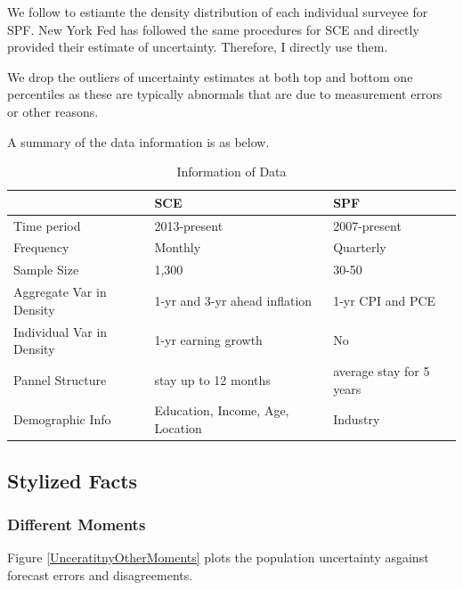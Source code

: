 \documentclass[]{article}
\begin{document}
We follow \cite{Manski} to estiamte the density distribution of each individual surveyee for SPF. New York Fed has followed the same procedures for SCE and directly provided their estimate of uncertainty. Therefore, I directly use them. 

We drop the outliers of uncertainty estimates at both top and bottom one percentiles as these are typically abnormals that are due to measurement errors or other reasons.   


A summary of the data information is as below. 

\begin{table}[]
			\caption{Information of Data}
	\begin{tabular}{lll} 

		\hline 
		& SCE & SPF        \\
		\hline 
		Time period                                    & 2013-present                            & 2007-present             \\
		Frequency                                      & Monthly                                 & Quarterly                \\
		Sample Size                                    & 1,300                                   & 30-50                    \\
		Aggregate Var in Density                       & 1-yr  and 3-yr ahead inflation          & 1-yr CPI and PCE         \\
		Individual Var in Density                      & 1-yr earning growth                     & No                       \\
		Pannel Structure                               & stay up to 12 months                    & average stay for 5 years \\
		Demographic Info                        & Education, Income, Age, Location        & Industry    \\
		\hline 
	\end{tabular}
\end{table}


\subsection{Stylized Facts}

\subsubsection{Different Moments}

Figure \ref{UnceratitnyOtherMoments} plots the population uncertainty asgainst forecast errors and disagreements. 
\end{document}
